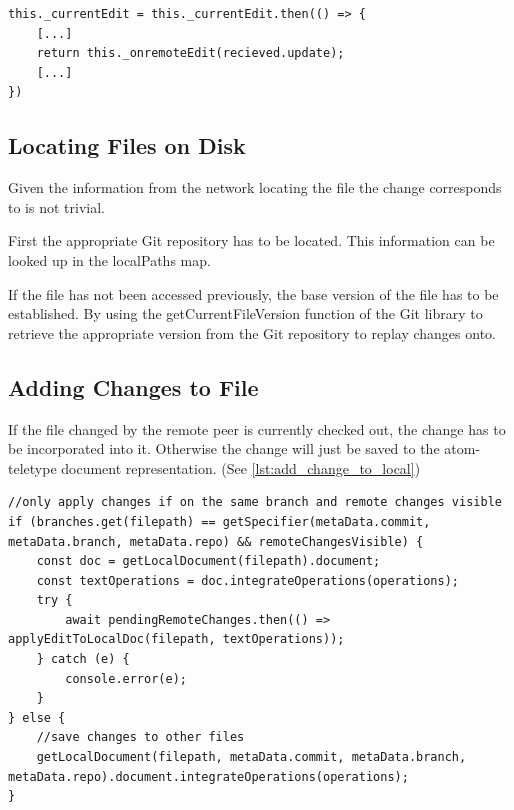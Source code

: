 \begin{lstlisting}[label={lst:promise_chain}, caption=Network Promise Chain]
this._currentEdit = this._currentEdit.then(() => {
    [...]
    return this._onremoteEdit(recieved.update);
    [...]
})
\end{lstlisting}

\subsection{Locating Files on Disk}

Given the information from the network locating the file the change corresponds to is not trivial.

First the appropriate Git repository has to be located.
This information can be looked up in the localPaths map.

If the file has not been accessed previously, the base version of the file has to be established.
By using the getCurrentFileVersion function of the Git library to retrieve the appropriate version from the Git repository to replay changes onto.

\subsection{Adding Changes to File}

If the file changed by the remote peer is currently checked out, the change has to be incorporated into it. Otherwise the change will just be saved to the atom-teletype document representation. (See \ref{lst:add_change_to_local})

\begin{lstlisting}[label={lst:add_change_to_local}, caption=Adding Change to Local Document]
//only apply changes if on the same branch and remote changes visible
if (branches.get(filepath) == getSpecifier(metaData.commit, metaData.branch, metaData.repo) && remoteChangesVisible) {
    const doc = getLocalDocument(filepath).document;
    const textOperations = doc.integrateOperations(operations);
    try {
        await pendingRemoteChanges.then(() => applyEditToLocalDoc(filepath, textOperations));
    } catch (e) {
        console.error(e);
    }
} else {
    //save changes to other files
    getLocalDocument(filepath, metaData.commit, metaData.branch, metaData.repo).document.integrateOperations(operations);
}
\end{lstlisting}